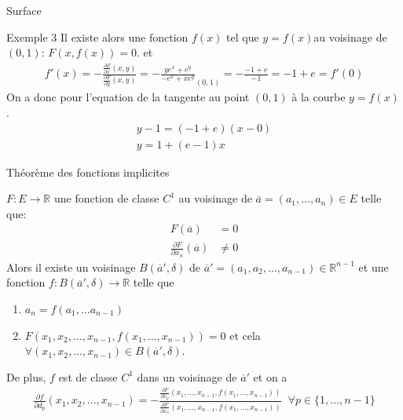\begin{parag}{Surface}
\begin{subparag}{Exemple 3}
        Il existe alors une fonction $f\left(x\right)$ tel que $y = f\left(x\right)$au voisinage de $\left(0, 1\right)$: $F\left(x, f\left(x\right)\right) = 0$. et
        \begin{align*} f'\left(x\right) = -\frac{\frac{\partial F}{\partial x}\left(x, y\right)}{\frac{\partial F}{\partial y}\left(x, y\right)} =- \frac{ye^x + e^y}{-e^x + xe^y}_{\left(0, 1\right)} = -\frac{-1 + e}{-1} = -1 + e = f'\left(0\right) \end{align*}
        On a donc pour l'equation de la tangente au point $\left(0, 1\right)$ à la courbe $y = f\left(x\right)$.
        \begin{align*} y - 1 = \left(-1 + e\right)\left(x - 0\right)\\
        y = 1 + \left(e-1\right)x\end{align*}
        
        
    \end{subparag}
\end{parag}
\begin{parag}{Théorème des fonctions implicites}
    \begin{theoreme}
    $F: E \to \mathbb{R}$ une fonction de classe $C^1$ au voisinage de $\overline{a} = \left(a_1, \ldots, a_n\right) \in E$ telle que:
   \begin{align*} 
       F\left(\overline{a}\right) &= 0\\
       \frac{\partial F}{\partial x_n}\left(\overline{a}\right) &\neq 0
   \end{align*}
   Alors il existe un voisinage $B\left( \overline{a}', \delta\right)$ de $\overline{a}' = \left(a_1, a_2, \ldots, a_{n-1}\right)\in \mathbb{R}^{n-1}$ et une fonction $f : B\left(\overline{a}', \delta\right) \to \mathbb{R}$ telle que\\
   \begin{enumerate}
       \item $a_n = f\left(a_1, \ldots a_{n-1}\right)$
       \item $F\left(x_1, x_2, \ldots, x_{n-1}, f\left(x_1, \ldots, x_{n-1}\right)\right) = 0 $ et cela $\forall \left(x_1, x_2, \ldots, x_{n-1}\right) \in B\left( \overline{a}', \delta\right)$.
   \end{enumerate}
   
    \end{theoreme}
    De plus, $f$ est de classe $C^1$ dans un voisinage de $\overline{a}'$ et on a
    \begin{align*} \frac{\partial f}{\partial d_p} \left(x_1, x_2, \ldots, x_{n-1}\right) = - \frac{\frac{\partial F}{\partial x_p}\left(x_1, \ldots, x_{n-1}, f\left(x_1, \ldots, x_{n-1}\right)\right)}{\frac{\partial F}{\partial x_n}\left(x_1, \ldots, x_{n-1}, f\left(x_1, \ldots, x_{n-1}\right)\right)} \; \; \forall p \in \{1, \ldots, n-1\} \end{align*}

\end{parag}

